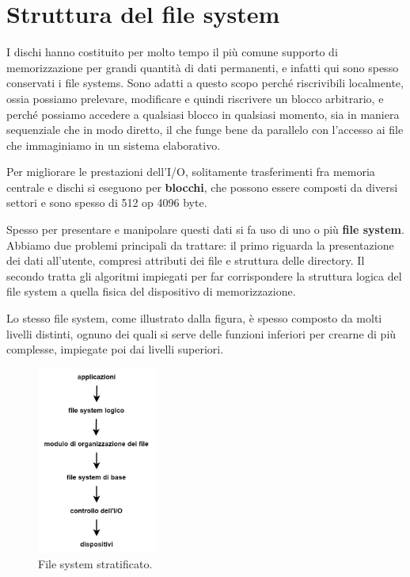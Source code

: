 \section{Struttura del file system}
    I dischi hanno costituito per molto tempo il più comune supporto di memorizzazione per grandi quantità di dati permanenti, e infatti qui sono spesso conservati i file systems. Sono adatti a questo scopo perché riscrivibili localmente, ossia possiamo prelevare, modificare e quindi riscrivere un blocco arbitrario, e perché possiamo accedere a qualsiasi blocco in qualsiasi momento, sia in maniera sequenziale che in modo diretto, il che funge bene da parallelo con l'accesso ai file che immaginiamo in un sistema elaborativo.
    
    Per migliorare le prestazioni dell'I/O, solitamente trasferimenti fra memoria centrale e dischi si eseguono per \textbf{blocchi}, che possono essere composti da diversi settori e sono spesso di 512 op 4096 byte.
    
    Spesso per presentare e manipolare questi dati si fa uso di uno o più \textbf{file system}. Abbiamo due problemi principali da trattare: il primo riguarda la presentazione dei dati all'utente, compresi attributi dei file e struttura delle directory. Il secondo tratta gli algoritmi impiegati per far corrispondere la struttura logica del file system a quella fisica del dispositivo di memorizzazione.
    
    Lo stesso file system, come illustrato dalla figura, è spesso composto da molti livelli distinti, ognuno dei quali si serve delle funzioni inferiori per crearne di più complesse, impiegate poi dai livelli superiori.
    
    \begin{figure}[h]
        \centering
        \includegraphics[width=0.35\textwidth]{img/img9.png}
        \caption{File system stratificato.}
        \label{fig:img9}
    \end{figure}
    
